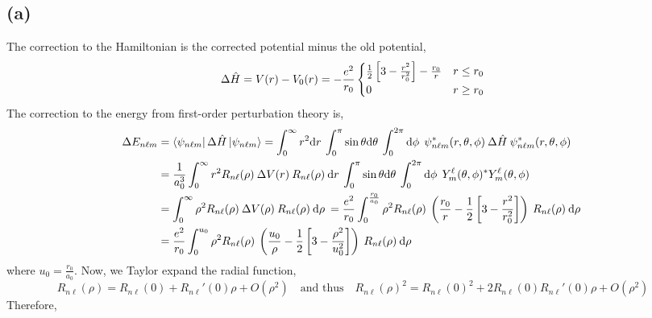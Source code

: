 \documentclass[12pt]{extarticle}
\begin{document}
\subsection*{(a)}
The correction to the Hamiltonian is the corrected potential minus the old potential,
\[ \Delta \hat{H} = V(r) - V_0(r) = - \frac{e^2}{r_0}
\begin{cases}
\frac{1}{2} \left[3 - \frac{r^2}{r_0^2} \right] - \frac{r_0}{r} & r \le r_0 \\
0 & r \ge r_0
\end{cases}\]
The correction to the energy from first-order perturbation theory is,
\begin{align*}
\Delta E_{n \ell m} & = \left< \psi_{n \ell m} \right| \Delta \hat{H} \left|  \psi_{n \ell m} \right> = \int_{0}^{\infty} r^2 \mathrm{d}r \: \int_{0}^{\pi} \sin{\theta} \mathrm{d}\theta \: \int_{0}^{2 \pi} \mathrm{d}\phi \: \: \psi_{n \ell m}^{*}(r, \theta, \phi) \: \Delta \hat{H} \: \psi_{n \ell m}^{*}(r, \theta, \phi) \\
& = \frac{1}{a_0^3} \int_{0}^{\infty} r^2  R_{n \ell}(\rho) \: \Delta V(r) \: R_{n \ell}(\rho)  \: \mathrm{d}r \: \int_{0}^{\pi} \sin{\theta} \mathrm{d}\theta \: \int_{0}^{2 \pi} \mathrm{d}\phi \: \: Y^{\ell}_m (\theta, \phi)^{*} Y^{\ell}_m (\theta, \phi) \\
& = \int_{0}^{\infty} \rho^2  R_{n \ell}(\rho) \: \Delta V(\rho) \: R_{n \ell}(\rho)  \: \mathrm{d}\rho \: = \frac{e^2}{r_0} \int_{0}^{\frac{r_0}{a_0}} \rho^2  R_{n \ell}(\rho) \: \left( \frac{r_0}{r} - \frac{1}{2} \left[3 - \frac{r^2}{r_0^2} \right] \right) \: R_{n \ell}(\rho)  \: \mathrm{d}\rho \: \\ 
& = \frac{e^2}{r_0} \int_{0}^{u_0} \rho^2  R_{n \ell}(\rho) \: \left( \frac{u_0}{\rho} - \frac{1}{2} \left[3 - \frac{\rho^2}{u_0^2} \right] \right) \: R_{n \ell}(\rho)  \: \mathrm{d}\rho \:
\end{align*}
where $u_0 = \frac{r_0}{a_0}$. Now, we Taylor expand the radial function,
\[ R_{n \ell}(\rho) =  R_{n \ell}(0) +  R_{n \ell}'(0) \rho + O(\rho^2) \quad \text{and thus} \quad R_{n \ell}(\rho)^2 = R_{n \ell}(0)^2 +  2 R_{n \ell}(0) R_{n \ell}'(0) \rho + O(\rho^2)\]
Therefore, 
\end{document}

